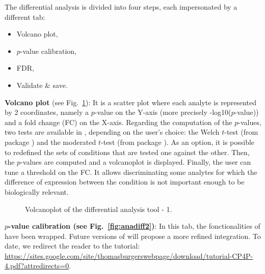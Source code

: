\documentclass[12pt]{article}
\begin{document}
{The differential analysis is divided into four steps, each impersonated by a different tab:
\begin{itemize}
\item Volcano plot,
\item $p$-value calibration,
\item FDR,
\item Validate \& save.
\end{itemize}}


\textbf {Volcano plot} (see Fig.~\ref{fig:anadiff1}): It is a scatter plot where each analyte is represented by 2 coordinates, namely a $p$-value on the Y-axis (more precisely -log10($p$-value)) and a fold change (FC) on the X-axis. Regarding the computation of the $p$-values, two tests are available in , depending on the user's choice: the Welch $t$-test (from package ) and the moderated $t$-test (from package ).
As an option, it is possible to redefined the sets of conditions that are tested one against the other. 
Then, the $p$-values are computed and a volcanoplot is displayed. %
Finally, the user can tune a threshold on the FC. It allows discriminating some analytes for which the difference of expression between the condition is not important enough to be biologically relevant.

\begin {figure}
\centering
{}
\caption{Volcanoplot of the differential analysis tool - 1.}\label{fig:anadiff1}
\end {figure}


\textbf{$p$-value calibration (see Fig.~\ref{fig:anadiff2})}: In this tab, the fonctionalities of  have been wrapped. Future versions of  will propose a more refined integration. To date, we redirect the reader to the  tutorial: \url{https://sites.google.com/site/thomasburgerswebpage/download/tutorial-CP4P-4.pdf?attredirects=0}. 
\end{document}
